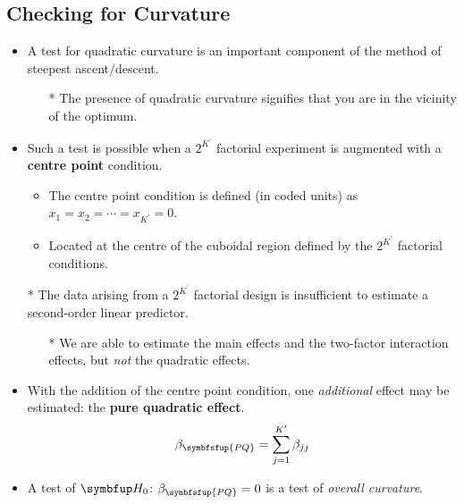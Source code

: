 \subsection{Checking for Curvature}
\begin{itemize}
    \item A test for quadratic curvature is an important component of the method of steepest ascent/descent.
          \begin{itemize}
              \item[*] The presence of quadratic curvature signifies that you are in the vicinity of the optimum.
          \end{itemize}
    \item Such a test is possible when a $ 2^{K^\prime} $ factorial experiment is augmented with a \textbf{centre point} condition.
          \begin{itemize}
              \item The centre point condition is defined (in coded units) as $ x_1=x_2=\cdots=x_{K^\prime}=0 $.
              \item Located at the centre of the cuboidal region defined by the $ 2^{K^\prime} $ factorial conditions.
          \end{itemize}
    \item[*] The data arising from a $ 2^{K^\prime} $ factorial design is insufficient to estimate a second-order linear predictor.
        \begin{itemize}
            \item[*] We are able to estimate the main effects and the two-factor interaction effects, but \emph{not} the quadratic effects.
        \end{itemize}
    \item With the addition of the centre point condition, one \emph{additional} effect may be estimated: the \textbf{pure quadratic effect}.
          \[ \beta_{\symbfsfup{PQ}}=\sum_{j=1}^{K^\prime} \beta_{jj} \]
    \item A test of $ \HN $: $ \beta_{\symbfsfup{PQ}}=0 $ is a test of \emph{overall curvature}.
\end{itemize}

